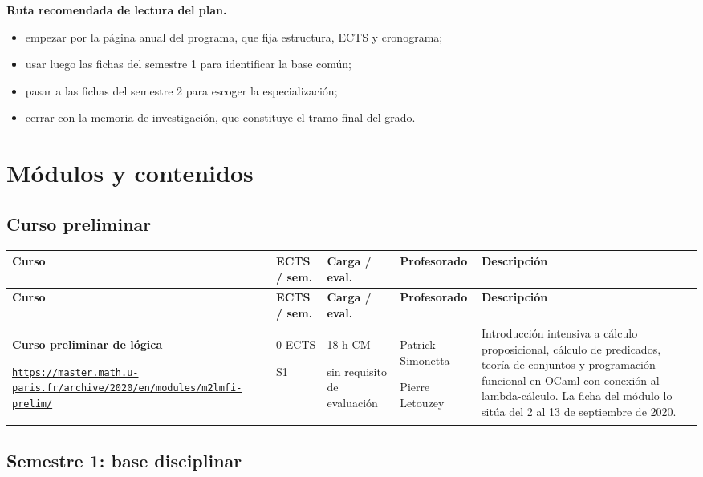 \documentclass[a4paper,11pt]{article}
\newcommand{\official}[1]{\href{#1}{\nolinkurl{#1}}}
\newcommand{\coursecell}[2]{\textbf{#1}\par{\scriptsize\color{upblue}\official{#2}}}
\newcommand{\metacell}[2]{#1\par{\footnotesize #2}}
\begin{document}
\textbf{Ruta recomendada de lectura del plan.}
\begin{itemize}
\setlength{\itemsep}{0.2em}
\item empezar por la página anual del programa, que fija estructura, ECTS y cronograma;
\item usar luego las fichas del semestre 1 para identificar la base común;
\item pasar a las fichas del semestre 2 para escoger la especialización;
\item cerrar con la memoria de investigación, que constituye el tramo final del grado.
\end{itemize}

\section*{Módulos y contenidos}

\subsection*{Curso preliminar}

\footnotesize
{}
\begin{longtable}{@{}M{3.65cm}M{1.35cm}M{2.35cm}M{2.35cm}J{5.05cm}@{}}
\textbf{Curso} & \textbf{ECTS / sem.} & \textbf{Carga / eval.} & \textbf{Profesorado} & \textbf{Descripción} \\
\midrule
\endfirsthead
{}
\textbf{Curso} & \textbf{ECTS / sem.} & \textbf{Carga / eval.} & \textbf{Profesorado} & \textbf{Descripción} \\
\midrule
\endhead
\bottomrule
\endfoot
\coursecell{Curso preliminar de lógica}{https://master.math.u-paris.fr/archive/2020/en/modules/m2lmfi-prelim/} & \metacell{0 ECTS}{S1} & \metacell{18 h CM}{sin requisito de evaluación} & Patrick Simonetta\par Pierre Letouzey & Introducción intensiva a cálculo proposicional, cálculo de predicados, teoría de conjuntos y programación funcional en OCaml con conexión al lambda-cálculo. La ficha del módulo lo sitúa del 2 al 13 de septiembre de 2020. \\
\end{longtable}

\normalsize

\subsection*{Semestre 1: base disciplinar}
\end{document}
